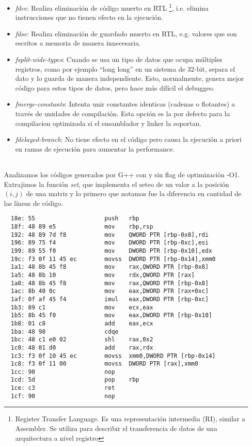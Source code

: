\begin{itemize}
	\item \textit{fdce}: Realiza eliminación de código muerto en RTL \footnote{Register Transfer Language. Es una representación intermedia (RI), similar a Assembler. Se utiliza para describir el transferencia de datos de una arquitectura a nivel registro}, i.e. elimina instrucciones que no tienen efecto en la ejecución.
	\item \textit{fdse}: Realiza eliminación de guardado muerto en RTL, e.g. valores que son escritos a memoria de manera innecesaria.
	\item \textit{fsplit-wide-types}: Cuando se usa un tipo de datos que ocupa múltiples registros, como por ejemplo ``long long'' en un sistema de 32-bit, separa el dato y lo guarda de manera independiente. Esto, normalmente, genera mejor código para estos tipos de datos, pero hace más difícil el debuggeo.
	\item \textit{fmerge-constants}: Intenta unir constantes identicas (cadenas o flotantes) a través de unidades de compilación. Esta opción es la por defecto para la compilacion optimizada si el ensamblador y linker la soportan.
	\item \textit{fdelayed-branch}: No tiene efecto en el código pero causa la ejecución a priori en ramas de ejecución para aumentar la performance.
\end{itemize}

~\\

Analizamos los códigos generados por G++ con y sin flag de optimización -O1. Extrajimos la función \textit{set}, que implementa el seteo de un valor a la posición $(i, j)$ de una matriz y lo primero que notamos fue la diferencia en cantidad de las líneas de código.

{} 
\begin{lstlisting}
  18e: 55                    push   rbp
  18f: 48 89 e5              mov    rbp,rsp
  192: 48 89 7d f8           mov    QWORD PTR [rbp-0x8],rdi
  196: 89 75 f4              mov    DWORD PTR [rbp-0xc],esi
  199: 89 55 f0              mov    DWORD PTR [rbp-0x10],edx
  19c: f3 0f 11 45 ec        movss  DWORD PTR [rbp-0x14],xmm0
  1a1: 48 8b 45 f8           mov    rax,QWORD PTR [rbp-0x8]
  1a5: 48 8b 10              mov    rdx,QWORD PTR [rax]
  1a8: 48 8b 45 f8           mov    rax,QWORD PTR [rbp-0x8]
  1ac: 8b 40 0c              mov    eax,DWORD PTR [rax+0xc] 
  1af: 0f af 45 f4           imul   eax,DWORD PTR [rbp-0xc]
  1b3: 89 c1                 mov    ecx,eax
  1b5: 8b 45 f0              mov    eax,DWORD PTR [rbp-0x10]
  1b8: 01 c8                 add    eax,ecx
  1ba: 48 98                 cdqe   
  1bc: 48 c1 e0 02           shl    rax,0x2
  1c0: 48 01 d0              add    rax,rdx
  1c3: f3 0f 10 45 ec        movss  xmm0,DWORD PTR [rbp-0x14]
  1c8: f3 0f 11 00           movss  DWORD PTR [rax],xmm0
  1cc: 90                    nop
  1cd: 5d                    pop    rbp
  1ce: c3                    ret    
  1cf: 90                    nop
\end{lstlisting}

